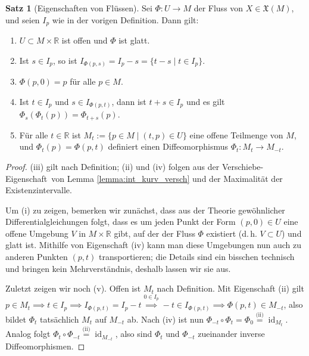 \documentclass[a4paper]{scrbook}
\numberwithin{equation}{chapter}
\DeclareMathOperator{\id}{id}
\newcommand{\R}{\mathbb{R}}
\theoremstyle{definition}
\newtheorem{satz}[defn]{Satz}
\begin{document}
\begin{satz}[Eigenschaften von Flüssen]
	Sei $\Phi\colon U \to M$ der Fluss von $X \in \mathfrak X(M)$, und seien $I_p$ wie in der vorigen Definition. Dann gilt:
	\begin{enumerate}[label=(\roman*)]
		\item $U \subset M \times \R$ ist offen und $\Phi$ ist glatt.
		\item Ist $s \in I_p$, so ist $I_{\Phi(p,s)} = I_p - s = \{t - s \mid t \in I_p\}$.
		\item $\Phi(p,0) = p$ für alle $p \in M$.
		\item Ist $t \in I_p$ und $s \in I_{\Phi(p,t)}$, dann ist $t+s \in I_p$ und es gilt $\Phi_s(\Phi_t(p)) = \Phi_{t+s}(p)$.
		\item Für alle $t\in\R$ ist $M_t := \{p \in M \mid (t,p) \in U\}$ eine offene Teilmenge von $M$, und $\Phi_t(p) = \Phi(p,t)$ definiert einen Diffeomorphismus $\Phi_t\colon M_t \to M_{-t}$.
	\end{enumerate}

	\begin{proof}
		(iii) gilt nach Definition; (ii) und (iv) folgen aus der \glqq Verschiebe-Eigenschaft\grqq\ von Lemma \ref{lemma:int_kurv_versch} und der Maximalität der Existenzintervalle.

		Um (i) zu zeigen, bemerken wir zunächst, dass aus der Theorie gewöhnlicher Differentialgleichungen folgt, dass es um jeden Punkt der Form $(p,0) \in U$ eine offene Umgebung $V$ in $M\times\R$ gibt, auf der der Fluss $\Phi$ existiert (d.\,h. $V\subset U$) und glatt ist. Mithilfe von Eigenschaft (iv) kann man diese Umgebungen nun auch zu anderen Punkten $(p,t)$ transportieren; die Details sind ein bisschen technisch und bringen kein Mehrverständnis, deshalb lassen wir sie aus.

		Zuletzt zeigen wir noch (v). Offen ist $M_t$ nach Definition. Mit Eigenschaft (ii) gilt $p \in M_t \implies t \in I_p \implies I_{\Phi(p,t)} = I_p - t \overset{0 \in I_p}{\implies} -t \in I_{\Phi(p,t)} \implies \Phi(p,t) \in M_{-t}$, also bildet $\Phi_t$ tatsächlich $M_t$ auf $M_{-t}$ ab. Nach (iv) ist nun $\Phi_{-t} \circ \Phi_t = \Phi_0 \overset{\text{(ii)}}{=} \id_{M_t}$. Analog folgt $\Phi_t \circ \Phi_{-t} \overset{\text{(ii)}}{=} \id_{M_{-t}}$, also sind $\Phi_t$ und $\Phi_{-t}$ zueinander inverse Diffeomorphismen.
	\end{proof}
\end{satz}
\end{document}
